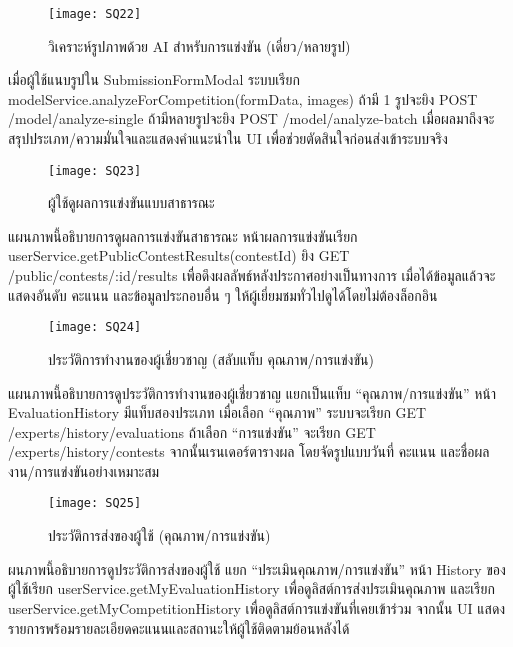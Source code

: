 \vspace{\baselineskip} 

\begin{figure}[h]
	\centering
	\texttt{[image: SQ22]}
	\caption{วิเคราะห์รูปภาพด้วย AI สำหรับการแข่งขัน (เดี่ยว/หลายรูป)}
\end{figure}

\indent เมื่อผู้ใช้แนบรูปใน SubmissionFormModal ระบบเรียก modelService.analyzeForCompetition(formData, images) ถ้ามี 1 รูปจะยิง POST /model/analyze-single ถ้ามีหลายรูปจะยิง POST /model/analyze-batch เมื่อผลมาถึงจะสรุปประเภท/ความมั่นใจและแสดงคำแนะนำใน UI เพื่อช่วยตัดสินใจก่อนส่งเข้าระบบจริง

\vspace{\baselineskip} 

\begin{figure}[h]
	\centering
	\texttt{[image: SQ23]}
	\caption{ผู้ใช้ดูผลการแข่งขันแบบสาธารณะ}
\end{figure}

\indent แผนภาพนี้อธิบายการดูผลการแข่งขันสาธารณะ หน้าผลการแข่งขันเรียก userService.getPublicContestResults(contestId) ยิง GET /public/contests/:id/results เพื่อดึงผลลัพธ์หลังประกาศอย่างเป็นทางการ เมื่อได้ข้อมูลแล้วจะแสดงอันดับ คะแนน และข้อมูลประกอบอื่น ๆ ให้ผู้เยี่ยมชมทั่วไปดูได้โดยไม่ต้องล็อกอิน

\newpage 

\begin{figure}[h]
	\centering
	\texttt{[image: SQ24]}
	\caption{ประวัติการทำงานของผู้เชี่ยวชาญ (สลับแท็บ คุณภาพ/การแข่งขัน)}
\end{figure}

\indent แผนภาพนี้อธิบายการดูประวัติการทำงานของผู้เชี่ยวชาญ แยกเป็นแท็บ “คุณภาพ/การแข่งขัน” หน้า EvaluationHistory มีแท็บสองประเภท เมื่อเลือก “คุณภาพ” ระบบจะเรียก GET /experts/history/evaluations ถ้าเลือก “การแข่งขัน” จะเรียก GET /experts/history/contests จากนั้นเรนเดอร์ตารางผล โดยจัดรูปแบบวันที่ คะแนน และชื่อผลงาน/การแข่งขันอย่างเหมาะสม

\newpage 
\vspace{\baselineskip} 

\begin{figure}[h]
	\centering
	\texttt{[image: SQ25]}
	\caption{ประวัติการส่งของผู้ใช้ (คุณภาพ/การแข่งขัน)}
\end{figure}

\indent ผนภาพนี้อธิบายการดูประวัติการส่งของผู้ใช้ แยก “ประเมินคุณภาพ/การแข่งขัน” หน้า History ของผู้ใช้เรียก userService.getMyEvaluationHistory เพื่อดูลิสต์การส่งประเมินคุณภาพ และเรียก userService.getMyCompetitionHistory เพื่อดูลิสต์การแข่งขันที่เคยเข้าร่วม จากนั้น UI แสดงรายการพร้อมรายละเอียดคะแนนและสถานะให้ผู้ใช้ติดตามย้อนหลังได้
\endgroup
